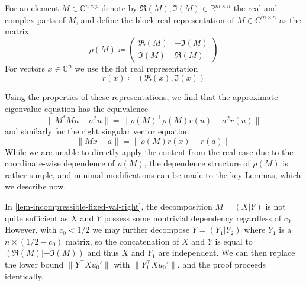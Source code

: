 \documentclass[11pt]{article}
\numberwithin{equation}{section}
\theoremstyle{remark}
\newcommand{\R}{\mathbb{R}}
\newcommand{\C}{\mathbb{C}}
\begin{document}
For an element $M \in \C^{n \times p}$ denote by $\Re(M), \Im(M) \in \R^{m \times n}$ the real and complex parts of $M$, and define the block-real representation of $M \in C^{m \times n}$ as the matrix 
\begin{equation*}
    \rho(M) \coloneqq         
    \begin{pmatrix}
        \Re(M) & -\Im(M) \\
        \Im(M) & \Re(M)
    \end{pmatrix}
\end{equation*}
For vectors $x \in \C^n$ we use the flat real representation 
\begin{equation*}
    r(x) \coloneqq (\Re(x), \Im(x))
\end{equation*}

Using the properties of these representations, we find that the approximate eigenvalue equation has the equivalence
\begin{equation}
    \| M^*M u - \sigma^2 u \| = \| \rho(M)^\top  \rho(M) r(u) - \sigma^2 r(u) \|
\end{equation}
and similarly for the right singular vector equation
\begin{equation}
    \| Mx - a \| = \|\rho(M)r(x) - r(a) \|
\end{equation}
While we are unable to directly apply the content from the real case due to the coordinate-wise dependence of $\rho(M)$, the dependence structure of $\rho(M)$ is rather simple, and minimal modifications can be made to the key Lemmas, which we describe now.

In \cref{lem-incompressible-fixed-val-right}, the decomposition $M = (X | Y)$ is not quite sufficient as $X$ and $Y$ possess some nontrivial dependency regardless of $c_0$. However, with $c_0 < 1/2$ we may further decompose $Y = (Y_1 | Y_2)$ where $Y_1$ is a $n \times (1/2 - c_0)$ matrix, so the concatenation of $X$ and $Y$ is equal to $(\Re(M) | -\Im(M))$ and thus $X$ and $Y_1$ are independent. We can then replace the lower bound $\|Y^\top  X u_0'\|$ with $\|Y_1^\top  X u_0'\|$, and the proof proceeds identically. 
\end{document}
